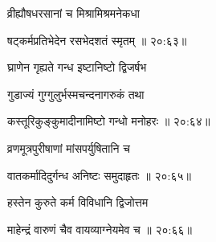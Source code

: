 {\devanagarifont व्रीह्यौषधरसानां च मिश्रामिश्रमनेकधा  \danda\dontdisplaylinenum }%


{\devanagarifont षट्कर्मप्रतिभेदेन रसभेदशतं स्मृतम् {॥ २०:६३॥} \veg\dontdisplaylinenum }%



{\devanagarifont घ्राणेन गृह्यते गन्ध इष्टानिष्टो द्विजर्षभ \thinspace{\dandab} \dontdisplaylinenum }%

{\devanagarifont गुडाज्यं गुग्गुलुर्भस्मचन्दनागरुकं तथा  \danda\dontdisplaylinenum }%


{\devanagarifont कस्तूरिकुङ्कुमादीनामिष्टो गन्धो मनोहरः {॥ २०:६४॥} \veg\dontdisplaylinenum }%

{\devanagarifont व्रणमूत्रपुरीषाणां मांसपर्युषितानि च \thinspace{\dandab} \dontdisplaylinenum }%


{\devanagarifont वातकर्मादिदुर्गन्ध अनिष्टः समुदाहृतः {॥ २०:६५॥} \veg\dontdisplaylinenum }%



{\devanagarifont हस्तेन कुरुते कर्म विविधानि द्विजोत्तम \thinspace{\dandab} \dontdisplaylinenum }%


{\devanagarifont माहेन्द्रं वारुणं चैव वायव्याग्नेयमेव च {॥ २०:६६॥} \veg\dontdisplaylinenum }%

